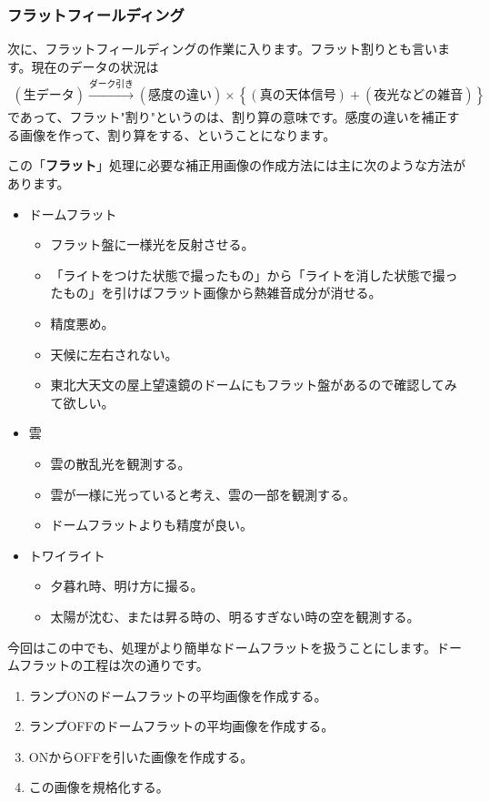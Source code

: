 \subsubsection{フラットフィールディング}
次に、フラットフィールディングの作業に入ります。フラット割りとも言います。現在のデータの状況は
\begin{align*}
  (\text{生データ}) \xrightarrow{\text{ダーク引き}} (感度の違い)\times\left\{ (真の天体信号) + (夜光などの雑音) \right\}
\end{align*}
であって、フラット"割り"というのは、割り算の意味です。感度の違いを補正する画像を作って、割り算をする、ということになります。\par
この「\textbf{フラット}」処理に必要な補正用画像の作成方法には主に次のような方法があります。
\begin{itemize}
  \item ドームフラット
  \begin{itemize}
    \item フラット盤に一様光を反射させる。
    \item 「ライトをつけた状態で撮ったもの」から「ライトを消した状態で撮ったもの」を引けばフラット画像から熱雑音成分が消せる。
    \item 精度悪め。
    \item 天候に左右されない。
    \item 東北大天文の屋上望遠鏡のドームにもフラット盤があるので確認してみて欲しい。
  \end{itemize}
  \item 雲
  \begin{itemize}
    \item 雲の散乱光を観測する。
    \item 雲が一様に光っていると考え、雲の一部を観測する。
    \item ドームフラットよりも精度が良い。
  \end{itemize}
  \item トワイライト
  \begin{itemize}
    \item 夕暮れ時、明け方に撮る。
    \item 太陽が沈む、または昇る時の、明るすぎない時の空を観測する。
  \end{itemize}
\end{itemize}

今回はこの中でも、処理がより簡単なドームフラットを扱うことにします。ドームフラットの工程は次の通りです。
\begin{enumerate}[(1)]
  \item ランプONのドームフラットの平均画像を作成する。
  \item ランプOFFのドームフラットの平均画像を作成する。
  \item ONからOFFを引いた画像を作成する。
  \item この画像を規格化する。
\end{enumerate}

